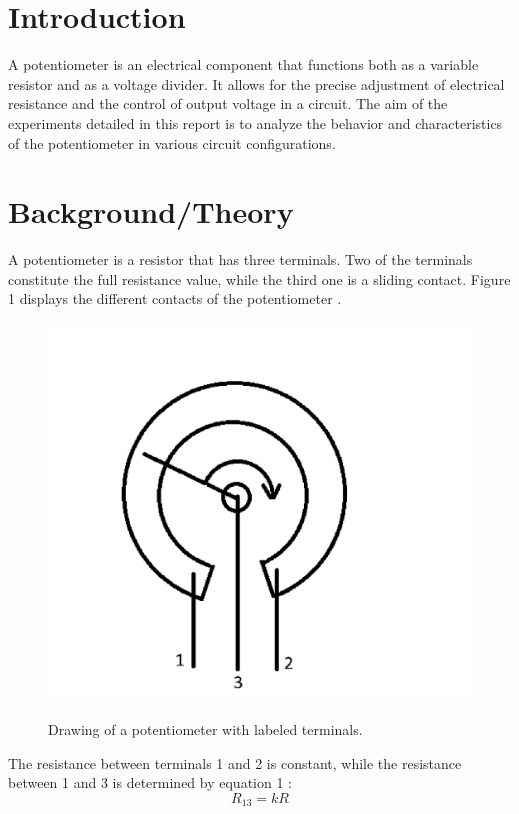 \documentclass[a4paper]{article}
\begin{document}

\section{Introduction}
A potentiometer is an electrical component that functions both as a variable resistor and as a voltage divider.
It allows for the precise adjustment of electrical resistance and the control of output voltage in a circuit. 
The aim of the experiments detailed in this report is to analyze the behavior and characteristics of the potentiometer
in various circuit configurations.
\section{Background/Theory}
A potentiometer is a resistor that has three terminals. Two of the terminals
constitute the full resistance value, while the third one is a sliding contact.
Figure 1 displays the different contacts of the potentiometer \cite{report}.
\begin{figure}[!ht]
    \centering
    \begin{minipage}{0.4\textwidth}
        \includegraphics[width = \textwidth]{potterminals.png}
       \label{fig:1}
        \caption{\centering Drawing of a potentiometer with labeled terminals.}    
    \end{minipage}
\end{figure}

The resistance between terminals 1 and 2 is constant, while the resistance
between 1 and 3 is determined by equation 1 \cite{report}:
\begin{equation}
    R_{13} = kR
\end{equation}
\end{document}
